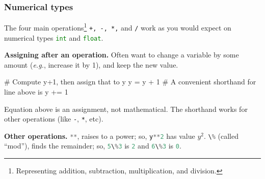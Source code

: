 \documentclass{beamer}
\newenvironment{codeblock}
    {\hfill\begin{beamerboxesrounded}[lower=codecol, width=0.8\textwidth]
    \medskip

    }
    { 
    \end{beamerboxesrounded}\hfill
    }
\theoremstyle{example}
\newcommand{\ct}[1]{\lstinline[language=Python,basicstyle=\ttfamily\footnotesize,stringstyle=\small\color{strings}]!#1!}
\newcommand{\ttt}[1]{{\small\texttt{#1}}}
\newcommand{\comment}[1]{}
\begin{document}
\begin{frame}[fragile]
\frametitle{Numerical types}

The four main operations\footnote{Representing addition, subtraction, multiplication, and division.} \ttt{+, -, *,} and \ttt{/} work as you would expect on numerical types \ct{int} and \ct{float}.

\pause
\vspace*{-6pt}
{\bf \color{mygreen} Assigning after an operation.} Often want to change a variable by some amount (\textit{e.g.}, increase it by 1), and keep the new value.

\begin{codeblock}

\begin{python}
# Compute y+1, then assign that to y
y = y + 1
# A convenient shorthand for line above is
y += 1
\end{python}

\end{codeblock}

\pause
Equation above is an assignment, not mathematical. The shorthand works for other operations (like \ttt{-}, \ttt{*}, etc).

\pause
\vspace*{-6pt}
\textbf{Other operations.} \newline
\ct{**}, raises to a power; so, \ct{y**2} has value $y^2$. \newline 
\pause
\ct{\%} (called ``mod''), finds the remainder; so, \ct{5\%3} is \ct{2} and \ct{6\%3} is \ct{0}.
\end{frame}

\comment{
\begin{frame}[fragile]
\frametitle{Logical types and {\ttm None}}

We have some logical types, as every language needs {--} \ttt{True} and \ttt{False}. 

Usually, no need to directly assign or work with these. They are ``under the hood'' when making comparisons. 
\begin{itemize}
	\item Technically, \ttt{True} and \ttt{False} are like \ct{1} and \ct{0} in Python. Use this fact only with \emph{extreme care}! (Maybe just avoid it.)
\end{itemize}
\begin{codeblock}

\begin{python}[numbers=none]
(*@\color{numeric}True@*)*(*@\color{numeric}False@*)
\end{python}

\end{codeblock}

$\qquad \uparrow$ the line above will return \ct{0}.
\vspace*{12pt}

The \emph{null} type in Python is \ttt{None}. We'll talk about using it in later lectures.
\end{frame}
}
\end{document}
